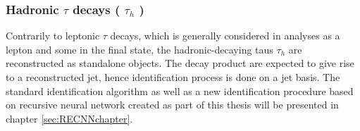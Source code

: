 \subsubsection{Hadronic $\tau$ decays ( $\tau_{h}$ )}
Contrarily to leptonic $\tau$ decays, which is generally considered in analyses as a lepton and some \ETm in the final state, the hadronic-decaying taus $\tau_{h}$ are reconstructed as standalone objects. The \tauh decay product are expected to give rise to a reconstructed jet, hence \tauh identification process is done on a jet basis. The standard \tauh identification algorithm as well as a new identification procedure based on recursive neural network created as part of this thesis will be presented in chapter \ref{sec:RECNNchapter}.